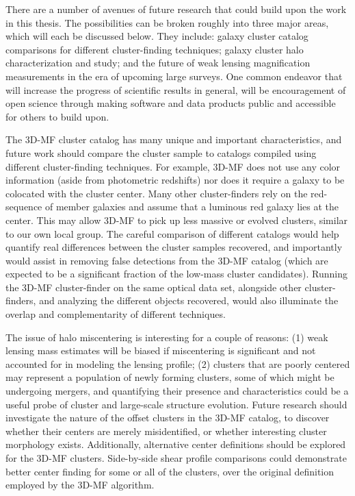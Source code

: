 There are a number of avenues of future research that could build upon the work in this thesis. The possibilities can be broken roughly into three major areas, which will each be discussed below. They include: galaxy cluster catalog comparisons for different cluster-finding techniques; galaxy cluster halo characterization and study; and the future of weak lensing magnification measurements in the era of upcoming large surveys. One common endeavor that will increase the progress of scientific results in general, will be encouragement of open science through making software and data products public and accessible for others to build upon.

The \ac{3D-MF} cluster catalog has many unique and important characteristics, and future work should compare the cluster sample to catalogs compiled using different cluster-finding techniques. For example, \ac{3D-MF} does not use any color information (aside from photometric redshifts) nor does it require a galaxy to be colocated with the cluster center. Many other cluster-finders rely on the red-sequence of member galaxies and assume that a luminous red galaxy lies at the center. This may allow \ac{3D-MF} to pick up less massive or evolved clusters, similar to our own local group. The careful comparison of different catalogs would help quantify real differences between the cluster samples recovered, and importantly would assist in removing false detections from the \ac{3D-MF} catalog (which are expected to be a significant fraction of the low-mass cluster candidates). Running the \ac{3D-MF} cluster-finder on the same optical data set, alongside other cluster-finders, and analyzing the different objects recovered, would also illuminate the overlap and complementarity of different techniques.

The issue of halo miscentering is interesting for a couple of reasons: (1) weak lensing mass estimates will be biased if miscentering is significant and not accounted for in modeling the lensing profile; (2) clusters that are poorly centered may represent a population of newly forming clusters, some of which might be undergoing mergers, and quantifying their presence and characteristics could be a useful probe of cluster and large-scale structure evolution. Future research should investigate the nature of the offset clusters in the \ac{3D-MF} catalog, to discover whether their centers are merely misidentified, or whether interesting cluster morphology exists. Additionally, alternative center definitions should be explored for the \ac{3D-MF} clusters. Side-by-side shear profile comparisons could demonstrate better center finding for some or all of the clusters, over the original definition employed by the \ac{3D-MF} algorithm.

